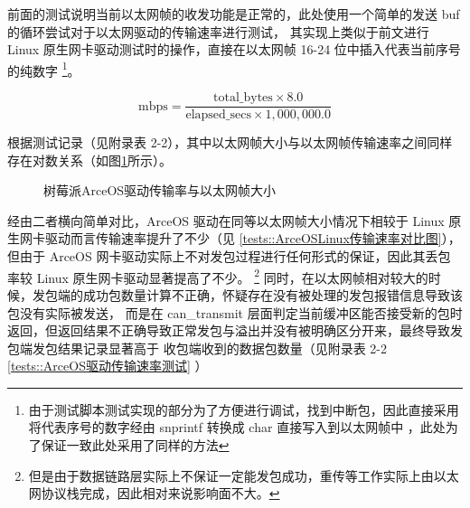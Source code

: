     前面的测试说明当前以太网帧的收发功能是正常的，此处使用一个简单的发送 buf 的循环尝试对于以太网驱动的传输速率进行测试，
    其实现上类似于前文进行 Linux 原生网卡驱动测试时的操作，直接在以太网帧 16-24 位中插入代表当前序号的纯数字
    \footnote{由于测试脚本测试实现的部分为了方便进行调试，找到中断包，因此直接采用将代表序号的数字经由 snprintf 转换成 char 直接写入到以太网帧中
    ，此处为了保证一致此处采用了同样的方法}。

    $$\text{mbps} = \frac{\text{total\_bytes} \times 8.0}{\text{elapsed\_secs} \times 1,000,000.0}$$

    根据测试记录（见附录表 2-2），其中以太网帧大小与以太网帧传输速率之间同样存在对数关系（如图\ref{tests::ArceOS网卡驱动传输率与以太网帧大小}所示）。

    \begin{figure}[H]
    \caption{树莓派ArceOS驱动传输率与以太网帧大小}    \label{tests::ArceOS网卡驱动传输率与以太网帧大小}
    \end{figure}

    经由二者横向简单对比，ArceOS 驱动在同等以太网帧大小情况下相较于 Linux 原生网卡驱动而言传输速率提升了不少（见 \ref{tests::ArceOSLinux传输速率对比图}），
    但由于 ArceOS 网卡驱动实际上不对发包过程进行任何形式的保证，因此其丢包率较 Linux 原生网卡驱动显著提高了不少。
    \footnote{但是由于数据链路层实际上不保证一定能发包成功，重传等工作实际上由以太网协议栈完成，因此相对来说影响面不大。}
    同时，在以太网帧相对较大的时候，发包端的成功包数量计算不正确，怀疑存在没有被处理的发包报错信息导致该包没有实际被发送，
    而是在 can\_transmit 层面判定当前缓冲区能否接受新的包时返回，但返回结果不正确导致正常发包与溢出并没有被明确区分开来，最终导致发包端发包结果记录显著高于
    收包端收到的数据包数量（见附录表 2-2 \ref{tests::ArceOS驱动传输速率测试} ）
    
